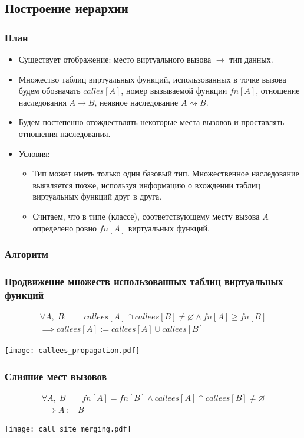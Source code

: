 \documentclass{beamer}
\begin{document}
\subsection{Построение иерархии}
\begin{frame}
\frametitle{План}
\begin{itemize}
    \item Существует отображение: место виртуального вызова $\rightarrow$ тип данных.
    \item Множество таблиц виртуальных функций, использованных в точке вызова будем обозначать $calles[A]$, номер вызываемой функции $fn[A]$, отношение наследования $A \to B $, неявное наследование $ A \rightsquigarrow B$.
    \item Будем постепенно отождествлять некоторые места вызовов и проставлять отношения наследования.
    \item Условия:
    \begin{itemize}
    \item Тип может иметь только один базовый тип. Множественное наследование выявляется позже, используя информацию о вхождении таблиц виртуальных функций друг в друга.
    \item Считаем, что в типе (классе), соответствующему месту вызова $A$ определено ровно $fn[A]$ виртуальных функций.
    \end{itemize}
\end{itemize}
\end{frame}

\subsubsection{Алгоритм}

\begin{frame}
\frametitle{Продвижение множеств использованных таблиц виртуальных функций}
\begin{eqnarray*}
\forall A,\;B:\qquad callees[A] \cap callees[B] \neq \varnothing \wedge fn[A] \geq fn[B]\\
\implies callees[A] := callees[A] \cup callees[B]
\end{eqnarray*}
\begin{center}
    \texttt{[image: callees\_propagation.pdf]}
\end{center}
\end{frame}

\begin{frame}
\frametitle{Слияние мест вызовов}
\begin{eqnarray*}
\forall A,\;B\qquad fn[A] = fn[B] \wedge callees[A] \cap callees[B] \neq \varnothing\\
\implies A := B
\end{eqnarray*}
\begin{center}
    \texttt{[image: call\_site\_merging.pdf]}
\end{center}
\end{frame}
\end{document}
